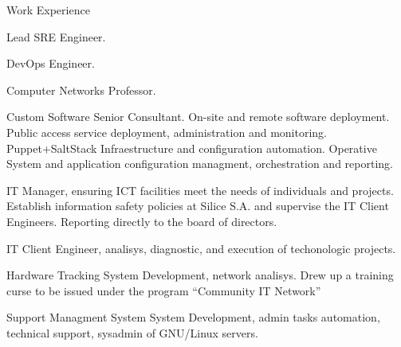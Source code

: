 \begin{rubric}{Work Experience}

 Lead SRE Engineer.

 DevOps Engineer. 

 Computer Networks Professor. 

 Custom Software Senior Consultant. On-site
	and remote software deployment. Public access service deployment, administration and monitoring. 
	Puppet+SaltStack Infraestructure and configuration automation. Operative System and application 
	configuration managment, orchestration and reporting.

 IT Manager, ensuring ICT facilities meet the needs of 
	individuals and projects. Establish information safety policies at Silice S.A. and supervise 
	the IT Client Engineers. Reporting directly to the board of directors.

 IT Client Engineer, analisys, diagnostic, and execution of techonologic projects.

 Hardware Tracking System Development, network analisys. Drew up
	a training curse to be issued under the program ``Community IT Network''

 Support Managment System System Development,  
	admin tasks automation, technical support, sysadmin of GNU/Linux servers.
\end{rubric}
